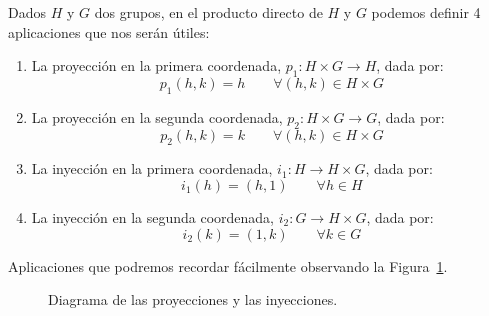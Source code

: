 \begin{definicion}
    Dados $H$ y $G$ dos grupos, en el producto directo de $H$ y $G$ podemos definir 4 aplicaciones que nos serán útiles:
    \begin{enumerate}
        \item La proyección en la primera coordenada, $p_1:H\times G\to H$, dada por:
            \begin{equation*}
                p_1(h,k) = h \qquad \forall (h,k)\in H\times G
            \end{equation*}
        \item La proyección en la segunda coordenada, $p_2:H\times G\to G$, dada por:
            \begin{equation*}
                p_2(h,k) = k \qquad \forall (h,k)\in H\times G
            \end{equation*}
        \item La inyección en la primera coordenada, $i_1:H\to H\times G$, dada por:
            \begin{equation*}
                i_1(h) = (h,1) \qquad \forall h\in H
            \end{equation*}
        \item La inyección en la segunda coordenada, $i_2:G\to H\times G$, dada por:
            \begin{equation*}
                i_2(k) = (1,k) \qquad \forall k\in G
            \end{equation*}
    \end{enumerate}
    Aplicaciones que podremos recordar fácilmente observando la Figura~\ref{fig:proyecciones_inyecciones}.
    \begin{figure}[H]
        \centering
        \caption{Diagrama de las proyecciones y las inyecciones.}
        \label{fig:proyecciones_inyecciones}
    \end{figure}
\end{definicion}

